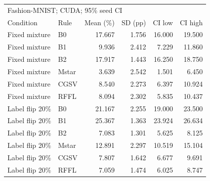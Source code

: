 \begin{tabular}{llrrrr}
\toprule
\multicolumn{6}{l}{Fashion-MNIST; CUDA; 95\% seed CI} \\
Condition & Rule & Mean (\%) & SD (pp) & CI low & CI high \\
\midrule
Fixed mixture & B0 & 17.667 & 1.756 & 16.000 & 19.500 \\
Fixed mixture & B1 & 9.936 & 2.412 & 7.229 & 11.860 \\
Fixed mixture & B2 & 17.917 & 1.443 & 16.250 & 18.750 \\
Fixed mixture & Mstar & 3.639 & 2.542 & 1.501 & 6.450 \\
Fixed mixture & CGSV & 8.540 & 2.273 & 6.397 & 10.924 \\
Fixed mixture & RFFL & 8.094 & 2.302 & 5.835 & 10.437 \\
Label flip 20\% & B0 & 21.167 & 2.255 & 19.000 & 23.500 \\
Label flip 20\% & B1 & 25.367 & 1.363 & 23.924 & 26.634 \\
Label flip 20\% & B2 & 7.083 & 1.301 & 5.625 & 8.125 \\
Label flip 20\% & Mstar & 12.891 & 2.297 & 10.519 & 15.104 \\
Label flip 20\% & CGSV & 7.807 & 1.642 & 6.677 & 9.691 \\
Label flip 20\% & RFFL & 7.059 & 1.474 & 6.025 & 8.747 \\
\bottomrule
\end{tabular}
